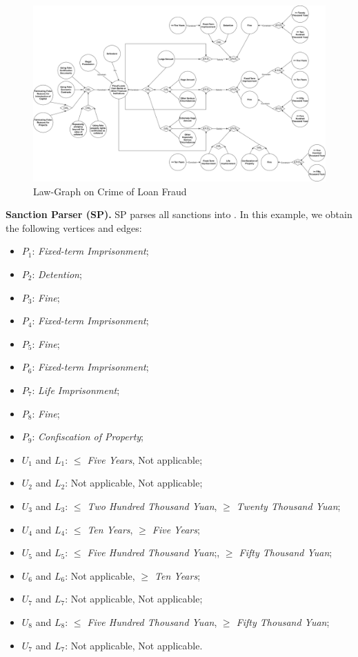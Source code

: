 \begin{figure}
    \centering
    \includegraphics[width=0.98\linewidth]{figs/Loan Fraud Law Graph.png}
    \caption{Law-Graph on Crime of Loan Fraud}
    \label{Law-Graph-Case-study}
    \vspace{-1em}
\end{figure}

\textbf{Sanction Parser (SP).}  
SP parses all sanctions into \lawgraph{}. In this example, we obtain the following vertices and edges:
\begin{itemize}
    \item $P_1$: \textit{Fixed-term Imprisonment};
    \item $P_2$: \textit{Detention};
    \item $P_3$: \textit{Fine};
    \item $P_4$: \textit{Fixed-term Imprisonment};
    \item $P_5$: \textit{Fine};
    \item $P_6$: \textit{Fixed-term Imprisonment};
    \item $P_7$: \textit{Life Imprisonment};
    \item $P_8$: \textit{Fine};
    \item $P_9$: \textit{Confiscation of Property};
    \item $U_1$ and $L_1$: \textit{$\leq$ Five Years},  Not applicable;
    \item $U_2$ and $L_2$: Not applicable, Not applicable;
    \item $U_3$ and $L_3$: \textit{$\leq$ Two Hundred Thousand Yuan}, \textit{$\geq$ Twenty Thousand Yuan};
    \item $U_4$ and $L_4$: \textit{$\leq$ Ten Years}, \textit{$\geq$ Five Years};
    \item $U_5$ and $L_5$: \textit{$\leq$ Five Hundred Thousand Yuan};, \textit{$\geq$ Fifty Thousand Yuan};
    \item $U_6$ and $L_6$: Not applicable, \textit{$\geq$ Ten Years};
    \item $U_7$ and $L_7$: Not applicable, Not applicable;
    \item $U_8$ and $L_8$: \textit{$\leq$ Five Hundred Thousand Yuan}, \textit{$\geq$ Fifty Thousand Yuan};
    \item $U_7$ and $L_7$: Not applicable, Not applicable.
\end{itemize}




